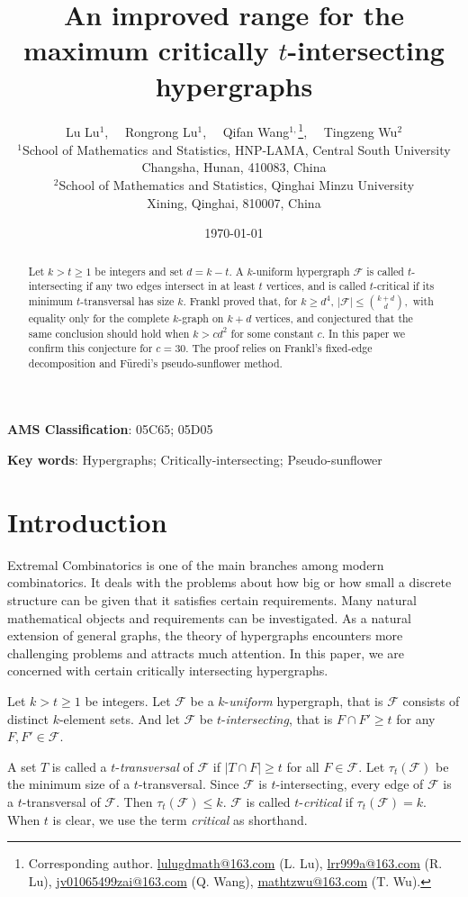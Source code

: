 \documentclass[11pt]{article}
\date{\today}
\title{\bf \Large An improved range for the maximum critically $t$-intersecting hypergraphs}
\author{
{\small    Lu Lu$^1$,  \ \ Rongrong Lu$^1$, \ \  Qifan Wang$^{1,}$\footnote{Corresponding author.\newline{ \hspace*{5mm}Email addresses:}   \url{lulugdmath@163.com} (L. Lu), \url{lrr999a@163.com} (R. Lu), \url{jv01065499zai@163.com} (Q. Wang), \url{mathtzwu@163.com} (T. Wu). }, \ \ Tingzeng Wu$^2$
}\\[2mm]
\small $^1$School of Mathematics and Statistics, HNP-LAMA, Central South University\\
 \small Changsha, Hunan, 410083, China\\
\small  $^2$School of Mathematics and Statistics, Qinghai Minzu University\\
\small  Xining, Qinghai, 810007, China
}
\numberwithin{equation}{section}
\newcommand{\F}{\mathcal{F}}
\begin{document}
	\maketitle
	\begin{abstract}
		Let $k>t\ge 1$ be integers and set $d=k-t$.  A $k$-uniform hypergraph $\mathcal F$ is called $t$-intersecting if any two edges intersect in at least $t$ vertices, and is called $t$-critical if its minimum $t$-transversal has size $k$.  Frankl proved that, for $k\ge d^4$,
		$
		|\mathcal F|\le \binom{k+d}{d},
		$
		with equality only for the complete $k$-graph on $k+d$ vertices, and conjectured that the same conclusion should  hold when $k>c d^2$ for some constant $c$.  In this paper we confirm this conjecture for $c=30$. The proof  relies on Frankl's fixed-edge decomposition and F\"{u}redi's pseudo-sunflower method.
		
		
	\end{abstract}
	
	
	
	
	{\bf AMS Classification}: 05C65; 05D05
	
	{\bf Key words}: Hypergraphs; Critically-intersecting; Pseudo-sunflower

	\section{Introduction}

Extremal Combinatorics is one of the main branches among modern combinatorics. It deals with the problems
about how big or how small a discrete structure can be given that it satisfies certain requirements. Many
natural mathematical objects and requirements can be investigated. As a natural extension of general graphs, the theory of
hypergraphs encounters more challenging problems and attracts much attention. In this paper, we are concerned with certain critically intersecting hypergraphs.



	Let $k> t\ge 1$ be integers. Let $\mathcal F$ be a $k$-\emph{uniform} hypergraph, that is $\F$ consists of distinct $k$-element sets. And let $\F$ be $t$-\emph{intersecting}, that is $F\cap F'\ge t$ for any $F,F'\in \F$.
	
	A set $T$ is called a $t$-\emph{transversal} of $\mathcal F$ if
	$
	|T\cap F|\ge t
	$ for all $F\in\mathcal F.
	$  Let $\tau_t(\mathcal F)$ be the minimum size of a $t$-transversal. Since $\F$ is $t$-intersecting, every edge of $\F$ is a $t$-transversal of $\F$. Then  $\tau_t(\mathcal F)\le k$. $\F$ is called $t$-\emph{critical} if $\tau_t(\mathcal F)= k$. When $t$ is clear, we use the term \emph{critical} as shorthand.
	
\end{document}
